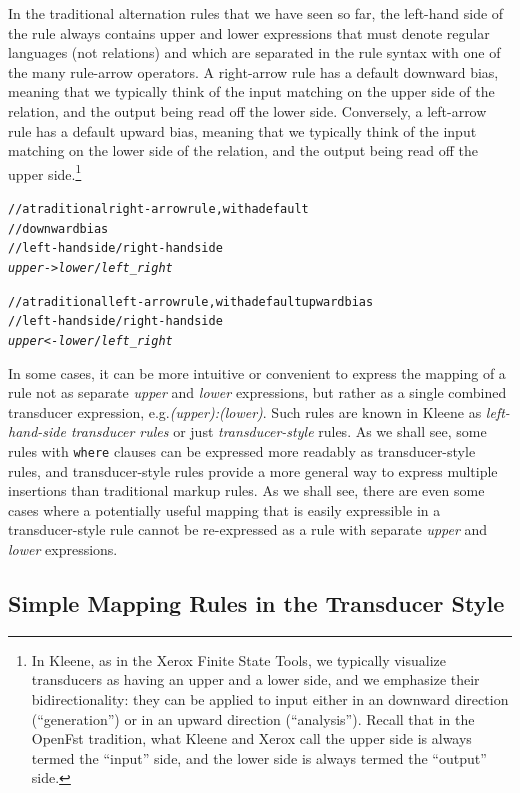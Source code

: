 In the traditional alternation rules that we have seen so far, the left-hand side of the rule always
contains upper and lower expressions that must denote regular languages (not relations) and which are
separated in the rule syntax with one of the many rule-arrow operators.  A right-arrow rule has a
default downward bias, meaning that we typically think of the input matching on the upper side of the
relation, and the output being read off the lower side.  Conversely, a left-arrow rule has a default
upward bias, meaning that we typically think of the input matching on the lower side of the relation,
and the output being read off the upper side.\footnote{In Kleene, as in the Xerox Finite State Tools, we
	typically visualize transducers as having an upper and a lower side, and we emphasize their
	bidirectionality: they can be applied to input either in an downward direction (``generation'')
	or in an upward direction (``analysis'').  Recall that in the OpenFst tradition, what Kleene and
	Xerox call the upper side is always termed the ``input'' side, and the lower side is always termed
the ``output'' side.}

\begin{alltt}
// a traditional right-arrow rule, with a default 
//    downward bias
// left-hand side / right-hand side
\emph{upper} -> \emph{lower} / \emph{left} _ \emph{right}

// a traditional left-arrow rule, with a default upward bias
// left-hand side / right-hand side
\emph{upper} <- \emph{lower} / \emph{left} _ \emph{right}
\end{alltt}

In some cases, it can be more intuitive or convenient to express the mapping of a rule not as 
separate \emph{upper}
and \emph{lower} expressions, but rather as a single combined transducer expression,
e.g.\@ \emph{(upper):(lower)}.
Such rules are known in Kleene as \emph{left-hand-side transducer rules}
or just \emph{transducer-style} rules.  As we shall see, some rules with
\texttt{where} clauses can be expressed more readably as
transducer-style rules, and transducer-style rules provide a more
general way to express multiple insertions than traditional markup rules.  As we shall see, there are even
some cases where a potentially useful mapping that is easily expressible in a transducer-style rule cannot be re-expressed as a rule
with separate \emph{upper} and \emph{lower} expressions.

\subsection{Simple Mapping Rules in the Transducer Style}

